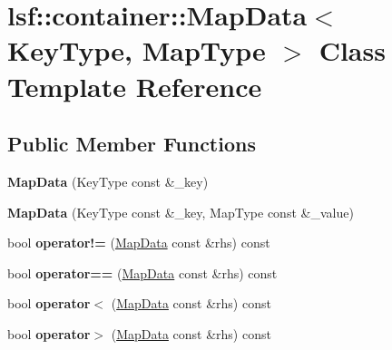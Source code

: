 \hypertarget{classlsf_1_1container_1_1MapData}{
\section{lsf::container::MapData$<$ KeyType, MapType $>$ Class Template Reference}
\label{classlsf_1_1container_1_1MapData}
}
\subsection*{Public Member Functions}
\begin{DoxyCompactItemize}
\item 
\hypertarget{classlsf_1_1container_1_1MapData_a076dadcd88cc1333816db9e461073b57}{
{\bfseries MapData} (KeyType const \&\_\-key)}
\label{classlsf_1_1container_1_1MapData_a076dadcd88cc1333816db9e461073b57}

\item 
\hypertarget{classlsf_1_1container_1_1MapData_a17644728a6dc58c9a1825e75bd1d63e3}{
{\bfseries MapData} (KeyType const \&\_\-key, MapType const \&\_\-value)}
\label{classlsf_1_1container_1_1MapData_a17644728a6dc58c9a1825e75bd1d63e3}

\item 
\hypertarget{classlsf_1_1container_1_1MapData_a6325c77a9e0b5f7a028d04540969dc91}{
bool {\bfseries operator!=} (\hyperlink{classlsf_1_1container_1_1MapData}{MapData} const \&rhs) const }
\label{classlsf_1_1container_1_1MapData_a6325c77a9e0b5f7a028d04540969dc91}

\item 
\hypertarget{classlsf_1_1container_1_1MapData_a1dd06357db5e2a04fec182178be2cf0e}{
bool {\bfseries operator==} (\hyperlink{classlsf_1_1container_1_1MapData}{MapData} const \&rhs) const }
\label{classlsf_1_1container_1_1MapData_a1dd06357db5e2a04fec182178be2cf0e}

\item 
\hypertarget{classlsf_1_1container_1_1MapData_acfd7e4723270d5fe361023e8133568dd}{
bool {\bfseries operator$<$} (\hyperlink{classlsf_1_1container_1_1MapData}{MapData} const \&rhs) const }
\label{classlsf_1_1container_1_1MapData_acfd7e4723270d5fe361023e8133568dd}

\item 
\hypertarget{classlsf_1_1container_1_1MapData_ad9c5233ac5786d9d48a71713fd80367a}{
bool {\bfseries operator$>$} (\hyperlink{classlsf_1_1container_1_1MapData}{MapData} const \&rhs) const }
\label{classlsf_1_1container_1_1MapData_ad9c5233ac5786d9d48a71713fd80367a}

\end{DoxyCompactItemize}
